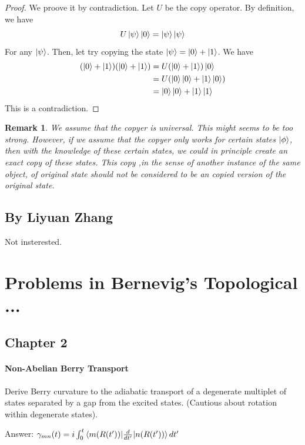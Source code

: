 \documentclass{article}
\numberwithin{equation}{subsection} %
\newtheorem{remark}{Remark}[section]
\theoremstyle{definition}
\begin{document}
    \begin{proof}
    We proove it by contradiction. Let $U$ be the copy operator. By definition,
    we have
    $$   U \ket{\psi}\ket{0} = \ket{\psi}\ket{\psi}$$
    For any $\ket{\psi}$.
    Then, let try copying the state $\ket{\psi} = \ket{0} + \ket{1}$. We have
    \begin{align*}
        (\ket{0}+\ket{1})(\ket{0}+\ket{1}) &= U (\ket{0}+\ket{1})\ket{0} \\
        &= U (\ket{0}\ket{0} + \ket{1}\ket{0} ) \\
        &= \ket{0}\ket{0} + \ket{1}\ket{1} \\
    \end{align*}
    This is a contradiction.
    \end{proof}
    \begin{remark}
        We assume that the copyer is universal. This might seems to be too
        strong. However, if we assume that the copyer only
        works for certain states $\ket{\phi}$, then with the knowledge
        of these certain states, we could in principle create an exact copy
        of these states. This copy ,in the sense of another instance of the
        same object, of original state should not be considered to be an
        copied version of the original state.
    \end{remark}
    
    \subsection{By Liyuan Zhang}
    Not insterested.
\section{Problems in Bernevig's Topological ...}

    \subsection{Chapter 2}
    \paragraph{Non-Abelian Berry Transport}
    Derive Berry curvature to the adiabatic transport of a degenerate
    multiplet of states separated by a gap from the excited states.
    (Cautious about rotation within degenerate states).

    Answer: $\gamma_{mn}(t) = i \int_0^t \braket{m(R(t'))|\frac{d}{dt'}|n(R(t'))}dt'$
\end{document}

